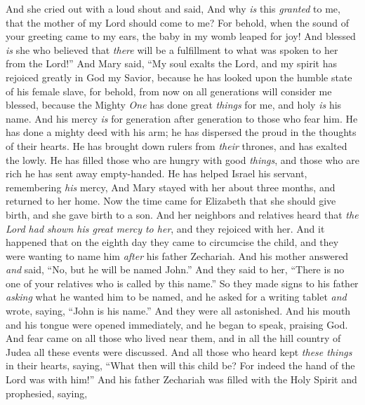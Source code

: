\begin{biblechapter}
\verse And she cried out with a loud shout and said,
\verse And why \textit{is} this \textit{granted} to me, that the mother of my Lord should come to me?
\verse For behold, when the sound of your greeting came to my ears, the baby in my womb leaped for joy!
\verse And blessed \textit{is} she who believed that \textit{there} will be a fulfillment to what was spoken to her from the Lord!”
 And Mary said,
\verse “My soul exalts the Lord,
\verse and my spirit has rejoiced greatly in God my Savior,
\verse because he has looked upon the humble state of his female slave, 
for behold, from now on all generations will consider me blessed,
\verse because the Mighty \textit{One} has done great \textit{things} for me, 
and holy \textit{is} his name.
\verse And his mercy \textit{is} for generation after generation 
to those who fear him.
\verse He has done a mighty deed with his arm; 
he has dispersed the proud in the thoughts of their hearts.
\verse He has brought down rulers from \textit{their} thrones, 
and has exalted the lowly.
\verse He has filled those who are hungry with good \textit{things}, 
and those who are rich he has sent away empty-handed.
\verse He has helped Israel his servant, 
remembering \textit{his} mercy,
\verse And Mary stayed with her about three months, and returned to her home.
 Now the time came for Elizabeth that she should give birth, and she gave birth to a son.
\verse And her neighbors and relatives heard that \textit{the Lord had shown his great mercy to her}, and they rejoiced with her.
\verse And it happened that on the eighth day they came to circumcise the child, and they were wanting to name him \textit{after} his father Zechariah.
\verse And his mother answered \textit{and} said, “No, but he will be named John.”
\verse And they said to her, “There is no one of your relatives who is called by this name.”
\verse So they made signs to his father \textit{asking} what he wanted him to be named,
\verse and he asked for a writing tablet \textit{and} wrote, saying, “John is his name.” And they were all astonished.
\verse And his mouth and his tongue were opened immediately, and he began to speak, praising God.
\verse And fear came on all those who lived near them, and in all the hill country of Judea all these events were discussed.
\verse And all those who heard kept \textit{these things} in their hearts, saying, “What then will this child be? For indeed the hand of the Lord was with him!”
 And his father Zechariah was filled with the Holy Spirit and prophesied, saying,

\end{biblechapter}
